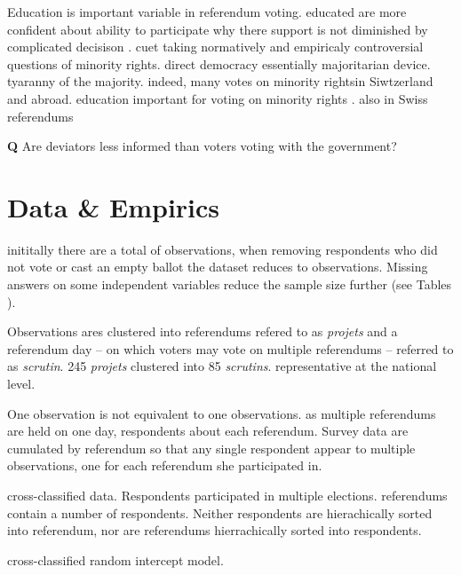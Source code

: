 \documentclass[11pt,a4paper]{article}\usepackage[]{graphicx}\usepackage[]{color}
\begin{document}

Education is important variable in referendum voting. educated are more confident about ability to participate why there support is not diminished by complicated decisison \citep{collingwood_levels_2012}. cuet taking %
normatively and empiricaly controversial questions of minority rights. direct democracy essentially majoritarian device. tyaranny of the majority. indeed, many votes on minority rightsin Siwtzerland and abroad. education important for voting on minority rights \citep{bowler_demanding_1998}. also in Swiss referendums \citep{vatter_who_2014} 

\textbf{Q} Are deviators less informed than voters voting with the government?



\section{Data \& Empirics}\label{sec:data}

inititally there are a total of %
observations, when removing respondents who did not vote or cast an empty ballot the dataset reduces to %
observations. Missing answers on some independent variables reduce the sample size further (see Tables %
).

Observations ares clustered into referendums refered to as \textit{projets} and a referendum day -- on which voters may vote on multiple referendums -- referred to as \textit{scrutin}. 245 \textit{projets} clustered into 85 \textit{scrutins}. representative at the national level. 

One observation is not equivalent to one observations. as multiple referendums are held on one day, respondents about each referendum. Survey data are cumulated by referendum so that any single respondent appear to multiple observations, one for each referendum she participated in. 

cross-classified data. Respondents participated in multiple elections. referendums contain a number of respondents. Neither respondents are hierachically sorted into referendum, nor are referendums hierrachically sorted into respondents.

cross-classified random intercept model. 
\end{document}
